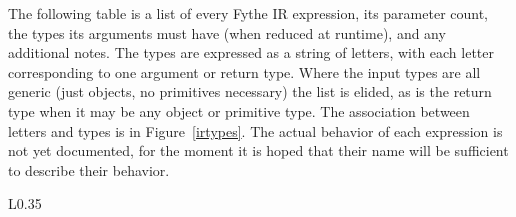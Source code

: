 The following table is a list of every Fythe IR expression, its parameter
count, the types its arguments must have (when reduced at runtime), and any
additional notes. The types are expressed as a string of letters, with each
letter corresponding to one argument or return type. Where the input types are
all generic (just objects, no primitives necessary) the list is elided, as is
the return type when it may be any object or primitive type. The association
between letters and types is in Figure~\ref{irtypes}. The actual behavior of
each expression is not yet documented, for the moment it is hoped that their
name will be sufficient to describe their behavior.


\begin{wrapfigure}{L}{0.35\textwidth}
\caption{Fythe type identifiers}
\label{irtypes}
\end{wrapfigure}
